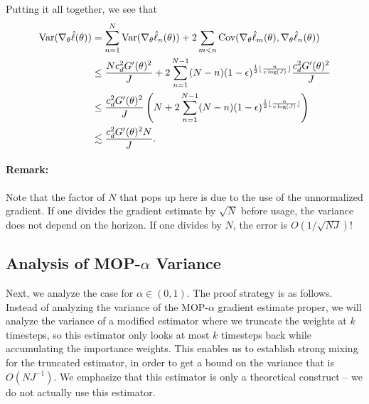 \documentclass{article}
\begin{document}
Putting it all together, we see that
\begin{align*}
    \text{Var}(\nabla_\theta \hat\ell(\theta)) &= \sum_{n=1}^N \text{Var}(\nabla_\theta\hat\ell_n(\theta)) + 2\sum_{m<n} \text{Cov}(\nabla_\theta\hat\ell_m(\theta),\nabla_\theta\hat\ell_n(\theta))\\
    &\leq \frac{Nc_d^2G'(\theta)^2}{J} + 2\sum_{n=1}^{N-1} (N-n)(1-\epsilon)^{\frac{1}{2}\lfloor \frac{n}{c\log(J)} \rfloor}\frac{c_d^2G'(\theta)^2}{J} \\
    &\leq \frac{c_d^2G'(\theta)^2}{J} \left(N + 2\sum_{n=1}^{N-1} (N-n) (1-\epsilon)^{\frac{1}{2}\lfloor \frac{n}{c\log(J)} \rfloor}\right) \\
    &\lesssim \frac{c_d^2G'(\theta)^2N}{J}.
\end{align*}




\paragraph{Remark:} Note that the factor of $N$ that pops up here is due to the use of the unnormalized gradient. If one divides the gradient estimate by $\sqrt{N}$ before usage, the variance does not depend on the horizon. If one divides by $N$, the error is $O(1/\sqrt{NJ})$!




\subsection{Analysis of MOP-$\alpha$ Variance}

Next, we analyze the case for $\alpha \in (0,1)$. The proof strategy is as follows. Instead of analyzing the variance of the MOP-$\alpha$ gradient estimate proper, we will analyze the variance of a modified estimator where we truncate the weights at $k$ timesteps, so this estimator only looks at most $k$ timesteps back while accumulating the importance weights. This enables us to establish strong mixing for the truncated estimator, in order to get a bound on the variance that is $O(NJ^{-1})$. We emphasize that this estimator is only a theoretical construct -- we do not actually use this estimator. 
\end{document}
